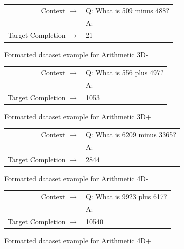 \begin{figure} { \tt \footnotesize \begin{tabularx}{\linewidth}{r X} \toprule Context $\to$ & Q: What is 509 minus 488? \\
 & A: \\
 \midrule Target Completion $\to$ & 21 \\
 \bottomrule \end{tabularx} }  \caption{Formatted dataset example for Arithmetic 3D-}  \label{eval:three_digit_subtraction}  \end{figure}%
\begin{figure} { \tt \footnotesize \begin{tabularx}{\linewidth}{r X} \toprule Context $\to$ & Q: What is 556 plus 497? \\
 & A: \\
 \midrule Target Completion $\to$ & 1053 \\
 \bottomrule \end{tabularx} }  \caption{Formatted dataset example for Arithmetic 3D+}  \label{eval:three_digit_addition}  \end{figure}%
\begin{figure} { \tt \footnotesize \begin{tabularx}{\linewidth}{r X} \toprule Context $\to$ & Q: What is 6209 minus 3365? \\
 & A: \\
 \midrule Target Completion $\to$ & 2844 \\
 \bottomrule \end{tabularx} }  \caption{Formatted dataset example for Arithmetic 4D-}  \label{eval:four_digit_subtraction}  \end{figure}%
\begin{figure} { \tt \footnotesize \begin{tabularx}{\linewidth}{r X} \toprule Context $\to$ & Q: What is 9923 plus 617? \\
 & A: \\
 \midrule Target Completion $\to$ & 10540 \\
 \bottomrule \end{tabularx} }  \caption{Formatted dataset example for Arithmetic 4D+}  \label{eval:four_digit_addition}  \end{figure}%



